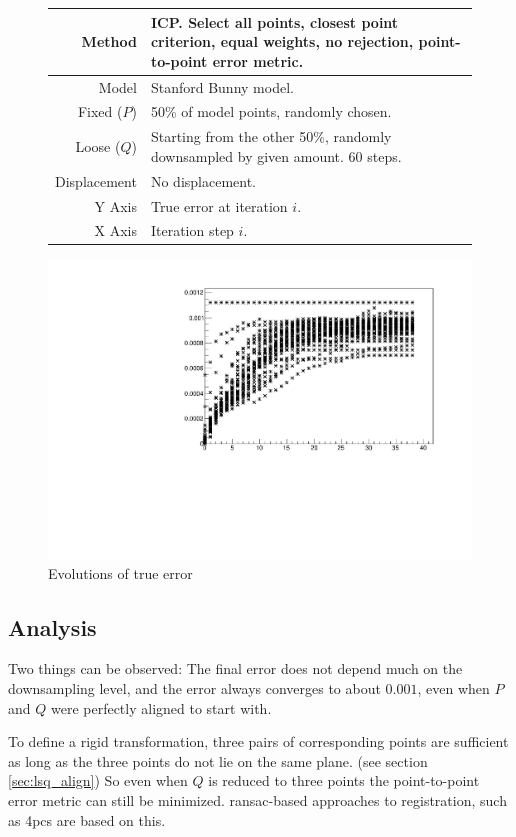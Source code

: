 \begin{figure}[H]
\begin{tabularx}{\textwidth}{|r|X|} \hline
Method & ICP. Select all points, closest point criterion, equal weights, no rejection, point-to-point error metric. \\ \hline
Model & Stanford Bunny model. \\ \hline
Fixed ($P$) & 50\% of model points, randomly chosen. \\ \hline
Loose ($Q$) & Starting from the other 50\%, randomly downsampled by given amount. $60$ steps. \\ \hline
Displacement & No displacement. \\ \hline
Y Axis & True error at iteration $i$. \\\hline
X Axis & Iteration step $i$. \\ \hline
\end{tabularx}
\end{figure}

\begin{figure}[H]
\centering
\includegraphics[width=.7\textwidth]{fig/bunny_globmin_ev.pdf}
\caption{Evolutions of true error}
\label{fig:bunny_hilo_ev}
\end{figure}



\subsection{Analysis}
Two things can be observed: The final error does not depend much on the downsampling level, and the error always converges to about $0.001$, even when $P$ and $Q$ were perfectly aligned to start with.

To define a rigid transformation, three pairs of corresponding points are sufficient as long as the three points do not lie on the same plane. (see section \ref{sec:lsq_align}) So even when $Q$ is reduced to three points the point-to-point error metric can still be minimized. \gls{ransac}-based approaches to registration, such as \gls{4pcs} are based on this.

